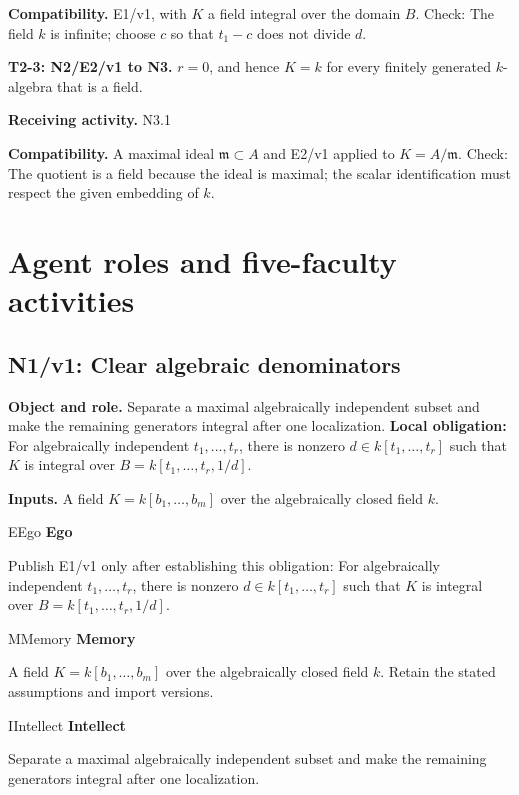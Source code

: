 \documentclass[preprint,12pt,aps,pra,showkeys,amsmath,amssymb,superscriptaddress,floatfix]{revtex4-2}
\theoremstyle{definition}
\theoremstyle{remark}
\newcommand{\mmfaculty}[3]{%
 \begin{mmfacultybox}{#1}{#2}
 {\sffamily\bfseries\color{MMBlue}#2}\par\smallskip #3
 \end{mmfacultybox}}
\newcommand{\field}[2]{\par\smallskip\noindent\textbf{#1.} #2\par}
\begin{document}
\field{Compatibility}{E1/v1, with \(K\) a field integral over the domain \(B\). Check: The
field \(k\) is infinite; choose \(c\) so that \(t_1-c\) does not divide
\(d\).}

\field{T2-3: N2/E2/v1 to N3}{\(r=0\), and hence \(K=k\) for every finitely generated \(k\)-algebra
that is a field.}

\field{Receiving activity}{N3.1}

\field{Compatibility}{A maximal ideal \(\mathfrak m\subset A\) and E2/v1 applied to
\(K=A/\mathfrak m\). Check: The quotient is a field because the ideal is
maximal; the scalar identification must respect the given embedding of
\(k\).}

\endgroup

\clearpage\section{Agent roles and five-faculty activities}\begingroup\small\linespread{1.05}\selectfont{}

\begingroup\footnotesize\linespread{1.05}\selectfont\let\small\footnotesize

\subsection{N1/v1: Clear algebraic denominators}

\field{Object and role}{Separate a maximal algebraically independent subset and make the
remaining generators integral after one localization. \textbf{Local
obligation:} For algebraically independent \(t_1,\ldots,t_r\), there is
nonzero \(d\in k[t_1,\ldots,t_r]\) such that \(K\) is integral over
\(B=k[t_1,\ldots,t_r,1/d]\).}

\field{Inputs}{A field \(K=k[b_1,\ldots,b_m]\) over the algebraically closed field
\(k\).}

\mmfaculty{E}{Ego}{Publish E1/v1 only after establishing this obligation: For algebraically
independent \(t_1,\ldots,t_r\), there is nonzero
\(d\in k[t_1,\ldots,t_r]\) such that \(K\) is integral over
\(B=k[t_1,\ldots,t_r,1/d]\).}

\mmfaculty{M}{Memory}{A field \(K=k[b_1,\ldots,b_m]\) over the algebraically closed field
\(k\). Retain the stated assumptions and import versions.}

\mmfaculty{I}{Intellect}{Separate a maximal algebraically independent subset and make the
remaining generators integral after one localization.}
\end{document}
